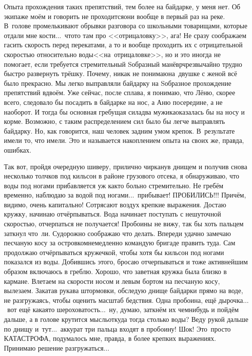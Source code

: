 Опыта прохождения таких препятствий, тем более на байдарке, у меня нет. Об экипаже моём и говорить не проходится\mdash они вообще в первый раз на реке. В~голове промелькивают обрывки разговора со школьными товарищами, которые отдали мне кости$\ldots$~что\sdash то там про <<отрицаловку>>, ага! Не сразу соображаем гасить скорость перед перекатами, а то и вообще проходить их с отрицательной скоростью относительно воды\mdash <<на~отрицаловке>>, но и это иногда не помогает, если требуется стремительный S\sdash образный манёвр\mdash чрезвычайно трудно быстро развернуть трёшку. Почему, никак не понимаю\mdash на~двушке с женой всё было прекрасно. Мы легко выправляли байдарку на S\sdash образное прохождение препятствий вдвоём. Уже сейчас, после сплава, я понимаю, что Лёню, скорее всего, следовало бы посадить в байдарке на нос, а Аню посередине, а не наоборот. И тогда бы основная гребущая сила\mdash два мужика\mdash оказалась бы на носу и корме. Возможно, с таким распределением сил было бы легче выправлять байдарку. Но, как говорится, наш человек задним умом крепок. В~результате имели то, что имели. Это и называется накоплением опыта на своих же, правда, ошибках.

Так вот, пройдя очередную шиверу, прилично чирканув днищем и получив снова несколько толчков под кильсон в районе грузового отсека, я обнаруживаю, что воды под ногами прибавляется уж как\sdash то больно стремительно. Не гребём временно, наблюдаю за водой под ногами$\ldots$~прибывает! ПРОБИЛИСЬ!!! Причём, видимо, очень капитально! Сотрясают воздух крепкие выражения. Достаю кружку, начинаю отчёрпываться. Вода начинает поступать с нешуточной скоростью, отчерпаться не получается! Пробоины не вижу, так бы хоть пальцем заткнул что~ли. Судорожно соображаю что делать. Впереди удачно замечаю песчаную косу за островком\mdash немедленно командую бригаде править туда. Сам продолжаю отчёрпываться кружечкой, чтобы хотя бы кильсон под ногами показался из воды. Добившись этого, бросаю отчерпываться и тоже активнейшим образом включаюсь в греблю. Хорошо, что заветная кружка была близко в кармане.
\newpage
Влетаем на скорости носом и левым бортом на песчаную косу, вылезаем. Закатав рукава штормовки, обследую днище байдарки прямо на воде, не разгружаясь, чтобы оценить масштаб бедствия. Одна пробоина, ещё дырочка$\ldots$~вот ещё какая\sdash то шероховатость$\ldots$~ну, думаю, заткнём их чем\sdash нибудь и пойдём дальше, а в голове крутится мысль\mdash откуда тогда столько воды? Веду рукой дальше по днищу и~тут$\ldots$~аккурат три пальца входят в пробоину! Шок! Это~просто КАТАСТРОФА, подумалось мне, правда, в более крепких выражениях. Принимаю решение разгружаться$\ldots$

